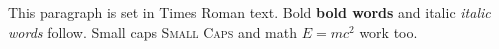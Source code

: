 \documentclass{article}
\begin{document}
This paragraph is set in Times Roman text.
Bold \textbf{bold words} and italic \textit{italic words} follow.
Small caps \textsc{Small Caps} and math $E = mc^2$ work too.
\end{document}
